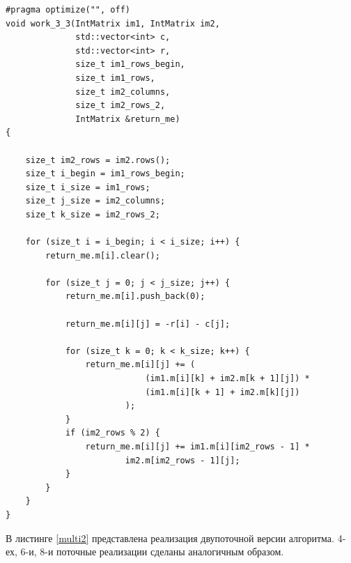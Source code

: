 \documentclass[a4paper, 14pt]{article}
\begin{document}
		\begin{lstlisting}[label= umn,caption= Перемножение матриц]
  #pragma optimize("", off)
void work_3_3(IntMatrix im1, IntMatrix im2,
              std::vector<int> c,
              std::vector<int> r,
              size_t im1_rows_begin,
              size_t im1_rows,
              size_t im2_columns,
              size_t im2_rows_2,
              IntMatrix &return_me)
{

    size_t im2_rows = im2.rows();
    size_t i_begin = im1_rows_begin;
    size_t i_size = im1_rows;
    size_t j_size = im2_columns;
    size_t k_size = im2_rows_2;

    for (size_t i = i_begin; i < i_size; i++) {
        return_me.m[i].clear();

        for (size_t j = 0; j < j_size; j++) {
            return_me.m[i].push_back(0);

            return_me.m[i][j] = -r[i] - c[j];

            for (size_t k = 0; k < k_size; k++) {
                return_me.m[i][j] += (
                            (im1.m[i][k] + im2.m[k + 1][j]) *
                            (im1.m[i][k + 1] + im2.m[k][j])
                        );
            }
            if (im2_rows % 2) {
                return_me.m[i][j] += im1.m[i][im2_rows - 1] *
                        im2.m[im2_rows - 1][j];
            }
        }
    }
}
	\end{lstlisting}
	
	\newpage
	В листинге \ref{multi2} представлена реализация двупоточной версии алгоритма. 4-ех, 6-и, 8-и поточные реализации сделаны аналогичным образом.
	
\end{document}

